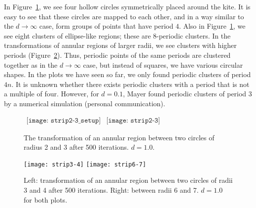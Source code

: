 \documentclass[12pt,twoside]{book}
\begin{document}
In Figure~\ref{fig:strip2-3}, we see four hollow circles symmetrically placed around the kite.
It is easy to see that these circles are mapped to each other, and in a way similar to the $d \to \infty$ case, form groups of points that have period $4$.
Also in Figure~\ref{fig:strip2-3}, we see eight clusters of ellipse-like regions; these are 8-periodic clusters.
In the transformations of annular regions of larger radii, we see clusters with higher periods (Figure~\ref{fig:strip3-4-6-7}).
Thus, periodic points of the same periods are clustered together as in the $d \to \infty$ case, but instead of squares, we have various circular shapes.
In the plots we have seen so far, we only found periodic clusters of period $4n$.
It is unknown whether there exists periodic clusters with a period that is not a multiple of four.
However, for $d = 0.1$, Mayer found periodic clusters of period 3 by a numerical simulation (personal communication).

\begin{figure}[ht]
  \begin{center}
    $
    \begin{array}{l}
      \texttt{[image: strip2-3\_setup]}
    \end{array}
    $\scalebox{1.75}{$\Rar$}$
    \begin{array}{l}
      \texttt{[image: strip2-3]}
    \end{array}
    $
    \caption{
      The transformation of an annular region between two circles of radius 2 and 3 after 500 iterations.
      $d = 1.0$.
    }
    \label{fig:strip2-3}
  \end{center}
\end{figure}

\begin{figure}[ht]
  \begin{center}
    \texttt{[image: strip3-4]}
    \texttt{[image: strip6-7]}
    \caption{Left: transformation of an annular region between two circles of radii 3 and 4 after 500 iterations.
      Right: between radii 6 and 7.
      $d = 1.0$ for both plots.
    }
    \label{fig:strip3-4-6-7}
  \end{center}
\end{figure}
\end{document}

